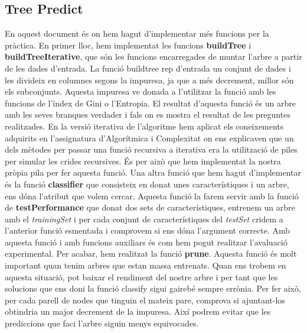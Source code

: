 \documentclass[11pt]{article}
\begin{document}
	\subsection{Tree Predict}
		En aquest document és on hem hagut d'implementar més funcions per la pràctica. En primer lloc, hem implementat les funcions \textbf{buildTree} i \textbf{buildTreeIterative}, que són les funcions encarregades de muntar l'arbre a partir de les dades d'entrada. La funció buildtree rep d'entrada un conjunt de dades i les divideix en columnes segons la impuresa, ja que a més decrement, millor són els subconjunts. Aquesta impuresa ve donada a l'utilitzar la funció amb les funcions de l'índex de Gini o l'Entropia. El resultat d'aquesta funció és un arbre amb les seves branques verdader i fals on es mostra el resultat de les preguntes realitzades. En la versió iterativa de l'algoritme hem aplicat els coneixements adquirits en l'assignatura d'Algorítmica i Complexitat on ens explicaven que un dels mètodes per passar una funció recursiva a iterativa era la utilització de piles per simular les crides recursives. És per això que hem implementat la nostra pròpia pila per fer aquesta funció. Una altra funció que hem hagut d'implementar és la funció \textbf{classifier} que consisteix en donat unes característiques i un arbre, ens dóna l'atribut que volem cercar. Aquesta funció la farem servir amb la funció de \textbf{testPerformance} que donat dos sets de característiques, entrenem un arbre amb el \textit{trainingSet} i per cada conjunt de característiques del \textit{testSet} cridem a l'anterior funció esmentada i comprovem si ens dóna l'argument correcte. Amb aquesta funció i amb funcions auxiliars és com hem pogut realitzar l'avaluació experimental. Per acabar, hem realitzat la funció \textbf{prune}. Aquesta funció és molt important quan tenim arbres que estan massa entrenats. Quan ens trobem en aquesta situació, pot baixar el rendiment del nostre arbre i per tant que les solucions que ens doni la funció classify sigui gairebé sempre errònia. Per fer això, per cada parell de nodes que tinguin el mateix pare, comprova si ajuntant-los obtindria un major decrement de la impuresa. Així podrem evitar que les prediccions que faci l'arbre siguin menys equivocades.
		
\end{document}
